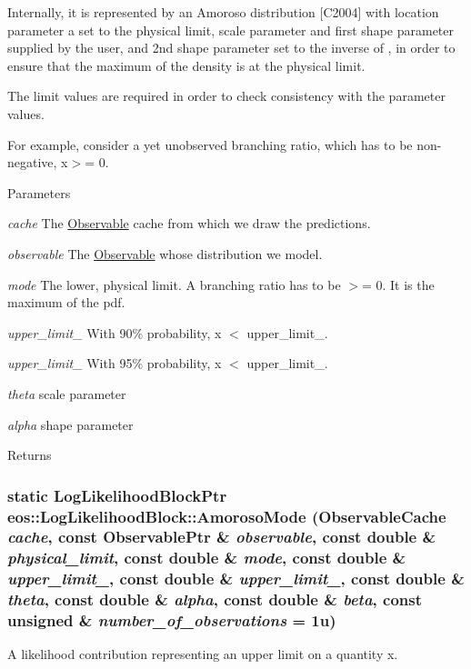Internally, it is represented by an Amoroso distribution \mbox{[}C2004\mbox{]} with location parameter a set to the physical limit, scale parameter  and first shape parameter  supplied by the user, and 2nd shape parameter  set to the inverse of , in order to ensure that the maximum of the density is at the physical limit.

The limit values are required in order to check consistency with the parameter values.

For example, consider a yet unobserved branching ratio, which has to be non-\/negative, x$>$= 0.


\begin{DoxyParams}{Parameters}
\item[{\em cache}]The \hyperlink{classeos_1_1Observable}{Observable} cache from which we draw the predictions. \item[{\em observable}]The \hyperlink{classeos_1_1Observable}{Observable} whose distribution we model. \item[{\em mode}]The lower, physical limit. A branching ratio has to be $>$= 0. It is the maximum of the pdf. \item[{\em upper\_\-limit\_\-90}]With 90\% probability, x $<$ upper\_\-limit\_. \item[{\em upper\_\-limit\_\-95}]With 95\% probability, x $<$ upper\_\-limit\_. \item[{\em theta}]scale parameter \item[{\em alpha}]shape parameter \end{DoxyParams}
\begin{DoxyReturn}{Returns}

\end{DoxyReturn}
\hypertarget{classeos_1_1LogLikelihoodBlock_a810a57eac9ccdc9cb7e49f0197adcee5}{
\subsubsection[{AmorosoMode}]{\setlength{\rightskip}{0pt plus 5cm}static {\bf LogLikelihoodBlockPtr} eos::LogLikelihoodBlock::AmorosoMode ({\bf ObservableCache} {\em cache}, \/  const {\bf ObservablePtr} \& {\em observable}, \/  const double \& {\em physical\_\-limit}, \/  const double \& {\em mode}, \/  const double \& {\em upper\_\-limit\_}, \/  const double \& {\em upper\_\-limit\_}, \/  const double \& {\em theta}, \/  const double \& {\em alpha}, \/  const double \& {\em beta}, \/  const unsigned \& {\em number\_\-of\_\-observations} = {\ttfamily 1u})}}
\label{classeos_1_1LogLikelihoodBlock_a810a57eac9ccdc9cb7e49f0197adcee5}
A likelihood contribution representing an upper limit on a quantity x.

